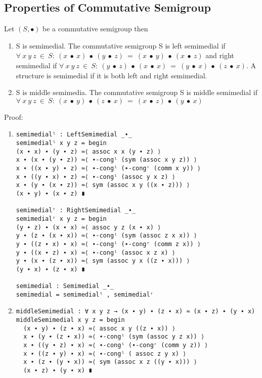 \subsection{Properties of Commutative Semigroup}
Let $(S, ∙)$ be a commutative semigroup then
\begin{enumerate}
\item S is semimedial. The commutative semigroup S is left semimedial if  \(
\forall\ x\ y\ z\ \in\ S:\ (x\ ∙\ x)\ ∙\ (y\ ∙\ z)\ =\ (x\ ∙\ y)\ ∙\ (x\ ∙\ z) \) and right
semimedial if \( \forall\ x\ y\ z\ \in\ S:\ (y\ ∙\ z)\ ∙\ (x\ ∙\ x)\ =\ (y\ ∙\ x)\ ∙\ (z\ ∙\ x) \).
A structure is semimedial if it is both left and right semimedial. 
\item S is middle semimedia.  The commutative semigroup S is middle semimedial
if  \(\forall\ x\ y\ z\  \in\ S:\ (x\ ∙\ y)\ ∙\ (z\ ∙\ x)\ =\ (x\ ∙\ z)\ ∙\ (y\ ∙\ x)\)
\end{enumerate}
Proof:
\begin{enumerate}
\item
\begin{verbatim}
semimedialˡ : LeftSemimedial _∙_
semimedialˡ x y z = begin
(x ∙ x) ∙ (y ∙ z) ≈⟨ assoc x x (y ∙ z) ⟩
x ∙ (x ∙ (y ∙ z)) ≈⟨ ∙-congˡ (sym (assoc x y z)) ⟩
x ∙ ((x ∙ y) ∙ z) ≈⟨ ∙-congˡ (∙-congʳ (comm x y)) ⟩
x ∙ ((y ∙ x) ∙ z) ≈⟨ ∙-congˡ (assoc y x z) ⟩
x ∙ (y ∙ (x ∙ z)) ≈⟨ sym (assoc x y ((x ∙ z))) ⟩
(x ∙ y) ∙ (x ∙ z) ∎

semimedialʳ : RightSemimedial _∙_
semimedialʳ x y z = begin
(y ∙ z) ∙ (x ∙ x) ≈⟨ assoc y z (x ∙ x) ⟩
y ∙ (z ∙ (x ∙ x)) ≈⟨ ∙-congˡ (sym (assoc z x x)) ⟩
y ∙ ((z ∙ x) ∙ x) ≈⟨ ∙-congˡ (∙-congʳ (comm z x)) ⟩
y ∙ ((x ∙ z) ∙ x) ≈⟨ ∙-congˡ (assoc x z x) ⟩
y ∙ (x ∙ (z ∙ x)) ≈⟨ sym (assoc y x ((z ∙ x))) ⟩
(y ∙ x) ∙ (z ∙ x) ∎

semimedial : Semimedial _∙_
semimedial = semimedialˡ , semimedialʳ
\end{verbatim}
\item
\begin{verbatim}
middleSemimedial : ∀ x y z → (x ∙ y) ∙ (z ∙ x) ≈ (x ∙ z) ∙ (y ∙ x)
middleSemimedial x y z = begin
  (x ∙ y) ∙ (z ∙ x) ≈⟨ assoc x y ((z ∙ x)) ⟩
  x ∙ (y ∙ (z ∙ x)) ≈⟨ ∙-congˡ (sym (assoc y z x)) ⟩
  x ∙ ((y ∙ z) ∙ x) ≈⟨ ∙-congˡ (∙-congʳ (comm y z)) ⟩
  x ∙ ((z ∙ y) ∙ x) ≈⟨ ∙-congˡ ( assoc z y x) ⟩
  x ∙ (z ∙ (y ∙ x)) ≈⟨ sym (assoc x z ((y ∙ x))) ⟩
  (x ∙ z) ∙ (y ∙ x) ∎
\end{verbatim}
\end{enumerate}
